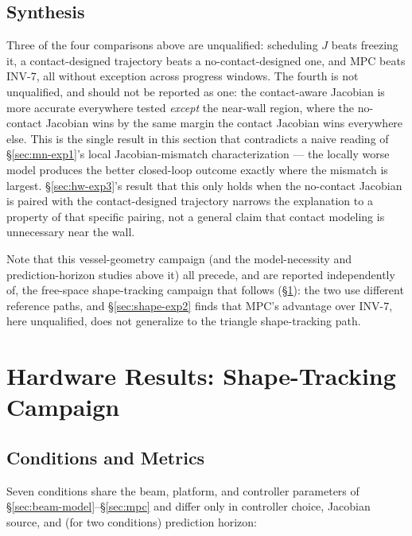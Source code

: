 \documentclass[journal]{IEEEtran}
\begin{document}
\subsection{Synthesis}
\label{sec:hw-synthesis}

Three of the four comparisons above are unqualified: scheduling $J$
beats freezing it, a contact-designed trajectory beats a no-contact-designed
one, and MPC beats INV-7, all without exception across progress
windows. The fourth is not unqualified, and should not be reported as
one: the contact-aware Jacobian is more accurate everywhere tested
\emph{except} the near-wall region, where the no-contact Jacobian wins
by the same margin the contact Jacobian wins everywhere else. This is
the single result in this section that contradicts a naive reading of
\S\ref{sec:mn-exp1}'s local Jacobian-mismatch characterization --- the
locally worse model produces the better closed-loop outcome exactly
where the mismatch is largest. \S\ref{sec:hw-exp3}'s result that this
only holds when the no-contact Jacobian is paired with the
contact-designed trajectory narrows the explanation to a property of
that specific pairing, not a general claim that contact modeling is
unnecessary near the wall.

Note that this vessel-geometry campaign (and the model-necessity and
prediction-horizon studies above it) all precede, and are reported
independently of, the free-space shape-tracking campaign that follows
(\S\ref{sec:shape-results}): the two use different reference paths,
and \S\ref{sec:shape-exp2} finds that MPC's advantage over INV-7, here
unqualified, does not generalize to the triangle shape-tracking path.


\section{Hardware Results: Shape-Tracking Campaign}
\label{sec:shape-results}

\subsection{Conditions and Metrics}
\label{sec:shape-conditions}

Seven conditions share the beam, platform, and controller parameters of
\S\ref{sec:beam-model}--\S\ref{sec:mpc} and differ only in controller
choice, Jacobian source, and (for two conditions) prediction horizon:
\end{document}
